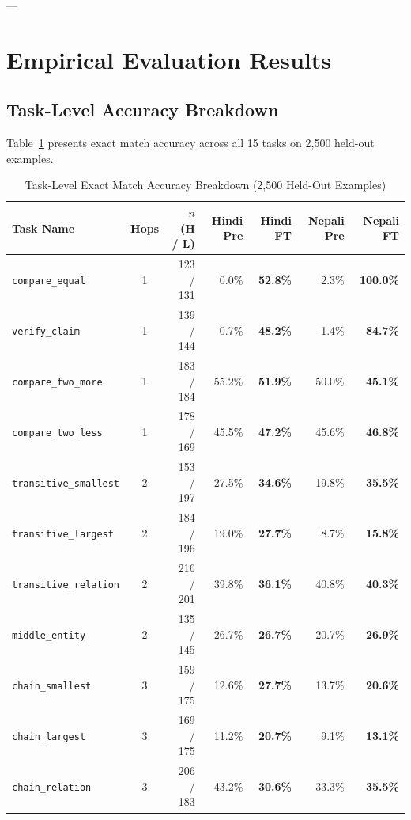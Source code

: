 \documentclass[11pt,a4paper]{article}
\begin{document}
---

\section{Empirical Evaluation Results}

\subsection{Task-Level Accuracy Breakdown}
Table~\ref{tab:task_breakdown} presents exact match accuracy across all 15 tasks on 2,500 held-out examples.

\begin{table}[H]
\centering
\small
\caption{Task-Level Exact Match Accuracy Breakdown (2,500 Held-Out Examples)}
\label{tab:task_breakdown}
\begin{tabular}{@{}lcrrrrr@{}}
\toprule
\textbf{Task Name} & \textbf{Hops} & \textbf{$n$ (H / L)} & \textbf{Hindi Pre} & \textbf{Hindi FT} & \textbf{Nepali Pre} & \textbf{Nepali FT} \\
\midrule
\texttt{compare\_equal} & 1 & 123 / 131 & 0.0\% & \textbf{52.8\%} & 2.3\% & \textbf{100.0\%} \\
\texttt{verify\_claim} & 1 & 139 / 144 & 0.7\% & \textbf{48.2\%} & 1.4\% & \textbf{84.7\%} \\
\texttt{compare\_two\_more} & 1 & 183 / 184 & 55.2\% & \textbf{51.9\%} & 50.0\% & \textbf{45.1\%} \\
\texttt{compare\_two\_less} & 1 & 178 / 169 & 45.5\% & \textbf{47.2\%} & 45.6\% & \textbf{46.8\%} \\
\texttt{transitive\_smallest} & 2 & 153 / 197 & 27.5\% & \textbf{34.6\%} & 19.8\% & \textbf{35.5\%} \\
\texttt{transitive\_largest} & 2 & 184 / 196 & 19.0\% & \textbf{27.7\%} & 8.7\% & \textbf{15.8\%} \\
\texttt{transitive\_relation} & 2 & 216 / 201 & 39.8\% & \textbf{36.1\%} & 40.8\% & \textbf{40.3\%} \\
\texttt{middle\_entity} & 2 & 135 / 145 & 26.7\% & \textbf{26.7\%} & 20.7\% & \textbf{26.9\%} \\
\texttt{chain\_smallest} & 3 & 159 / 175 & 12.6\% & \textbf{27.7\%} & 13.7\% & \textbf{20.6\%} \\
\texttt{chain\_largest} & 3 & 169 / 175 & 11.2\% & \textbf{20.7\%} & 9.1\% & \textbf{13.1\%} \\
\texttt{chain\_relation} & 3 & 206 / 183 & 43.2\% & \textbf{30.6\%} & 33.3\% & \textbf{35.5\%} \\

\end{tabular}
\end{table}
\end{document}
